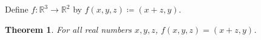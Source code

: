 \documentclass{article}
\newtheorem{theorem}{Theorem}
\begin{document}
Define $f:\mathbb{R}^3\to\mathbb{R}^2$ by $f(x,y,z)\coloneqq(x+z,y)$.
\begin{theorem}\label{thm:heldout}
For all real numbers $x,y,z$, $f(x,y,z)=(x+z,y)$.
\end{theorem}
\end{document}
